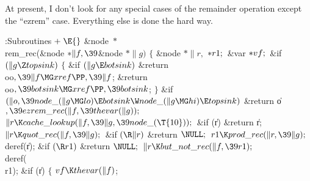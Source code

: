 At present, I don't look for any special cases of the
remainder operation
except the ``ezrem'' case. Everything else is done the hard way.

\Y\B\4:Subroutines\X${}\mathrel+\E{}$\6
\&{node} ${}{*}{}$\\{rem\_rec}(\&{node} ${}{*}\|f,\39{}$\&{node} ${}{*}\|g){}$%
\1\1\2\2\6
${}\{{}$\1\6
\&{node} ${}{*}\|r,{}$ ${}{*}\\{r1};{}$\6
\&{var} ${}{*}\\{vf};{}$\7
\&{if} ${}(\|g\Z\\{topsink}){}$\5
${}\{{}$\1\6
\&{if} ${}(\|g\E\\{botsink}){}$\1\5
\&{return} \\{oo}${},\39\|f\MG\\{xref}\PP,\39\|f{}$;\2%
\6
\&{return} \\{oo}${},\39\\{botsink}\MG\\{xref}\PP,\39\\{botsink}{}$;\6
\4${}\}{}$\2\6
\&{if} ${}(\|o,\39\\{node\_}(\|g\MG\\{lo})\E\\{botsink}\W\\{node\_}(\|g\MG%
\\{hi})\E\\{topsink}){}$\1\5
\&{return} \|o${},\39\\{ezrem\_rec}(\|f,\39\\{thevar}(\|g));{}$\2\6
${}\|r\K\\{cache\_lookup}(\|f,\39\|g,\39\\{node\_}(\T{10}));{}$\6
\&{if} (\|r)\1\5
\&{return} \|r;\2\6
${}\|r\K\\{quot\_rec}(\|f,\39\|g);{}$\6
\&{if} ${}(\R\|r){}$\1\5
\&{return} ${}\NULL;{}$\2\6
${}\\{r1}\K\\{prod\_rec}(\|r,\39\|g);{}$\6
\\{deref}(\|r);\6
\&{if} ${}(\R\\{r1}){}$\1\5
\&{return} ${}\NULL;{}$\2\6
${}\|r\K\\{but\_not\_rec}(\|f,\39\\{r1});{}$\6
\\{deref}(\\{r1});\6
\&{if} (\|r)\5
${}\{{}$\1\6
${}\\{vf}\K\\{thevar}(\|f){}$;\6
